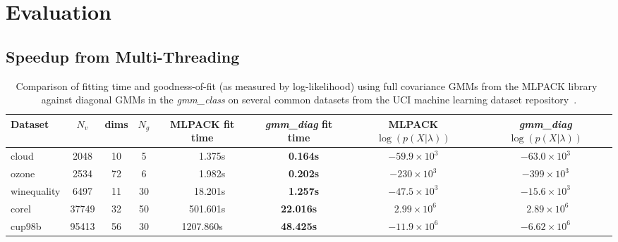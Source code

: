\section{Evaluation}
\label{sec:eval}

\subsection{Speedup from Multi-Threading}

\begin{table*}
\centering
\small
\begin{tabular}{|l|c|c|c|c|c|c|c|}
\hline
{\bf Dataset} & {\bf $N_v$} & {\bf dims} & {\bf $N_g$} & {\bf MLPACK fit time} & {\bfseries {\it\bfseries gmm\_diag} fit time} & {\bf MLPACK $\log(p(X|\lambda))$} & {\bf {\it\bfseries gmm\_diag} $\log(p(X|\lambda))$} \\
\hline
cloud & 2048 & 10 & 5 & ~~~~1.375s & ~~{\bf 0.164s} & $-59.9 \times 10^{3}$ & $-63.0 \times 10^{3}$ \\
ozone & 2534 & 72 & 6 & ~~~~1.982s & ~~{\bf 0.202s} & $-230 \times 10^{3}$ & $-399 \times 10^{3}$ \\
winequality & 6497 & 11 & 30 & ~~~18.201s & ~~{\bf 1.257s} & $-47.5 \times 10^{3}$ & $-15.6 \times 10^{3}$ \\
corel & 37749 & 32 & 50 & ~~501.601s & {\bf 22.016s} & $~~2.99 \times 10^{6}$ & $~~2.89 \times 10^{6}$ \\
cup98b & 95413 & 56 & 30 & 1207.860s & {\bf 48.425s} & $-11.9 \times 10^{6}$ & $-6.62 \times 10^{6}$ \\
\hline
\end{tabular}
\caption
  {
  Comparison of fitting time and goodness-of-fit (as measured by log-likelihood) using full covariance GMMs from the MLPACK library~\cite{Curtin_2013}
  against diagonal GMMs in the {\it gmm\_class}
  on several common datasets from the UCI machine learning dataset repository~\cite{Lichman_2013}.
  }
\label{tab:results}
\end{table*}

